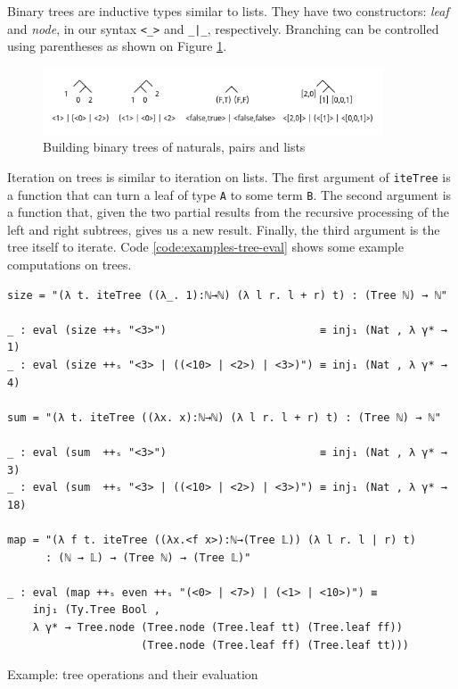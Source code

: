 Binary trees are inductive types similar to lists. They have two constructors: \textit{leaf} and \textit{node}, in our syntax \verb$<_>$ and \verb$_|_$, respectively. Branching can be controlled using parentheses as shown on Figure \ref{fig:tree-example}.

\begin{figure}[h!]
	\centering
	\includegraphics[width=0.9\textwidth]{../images/tree-example.png}
	\caption{Building binary trees of naturals, pairs and lists}
	\label{fig:tree-example}
\end{figure}

Iteration on trees is similar to iteration on lists. The first argument of \verb$iteTree$ is a function that can turn a leaf of type \verb$A$ to some term \verb$B$. The second argument is a function that, given the two partial results from the recursive processing of the left and right subtrees, gives us a new result. Finally, the third argument is the tree itself to iterate. Code \ref{code:examples-tree-eval} shows some example computations on trees.

\begin{listing}[H]
\begin{verbatim}
size = "(λ t. iteTree ((λ_. 1):ℕ→ℕ) (λ l r. l + r) t) : (Tree ℕ) → ℕ"

_ : eval (size ++ₛ "<3>")                        ≡ inj₁ (Nat , λ γ* → 1)
_ : eval (size ++ₛ "<3> | ((<10> | <2>) | <3>)") ≡ inj₁ (Nat , λ γ* → 4)

sum = "(λ t. iteTree ((λx. x):ℕ→ℕ) (λ l r. l + r) t) : (Tree ℕ) → ℕ"

_ : eval (sum  ++ₛ "<3>")                        ≡ inj₁ (Nat , λ γ* → 3)
_ : eval (sum  ++ₛ "<3> | ((<10> | <2>) | <3>)") ≡ inj₁ (Nat , λ γ* → 18)

map = "(λ f t. iteTree ((λx.<f x>):ℕ→(Tree 𝕃)) (λ l r. l | r) t)
      : (ℕ → 𝕃) → (Tree ℕ) → (Tree 𝕃)"

_ : eval (map ++ₛ even ++ₛ "(<0> | <7>) | (<1> | <10>)") ≡
    inj₁ (Ty.Tree Bool ,
    λ γ* → Tree.node (Tree.node (Tree.leaf tt) (Tree.leaf ff))
                     (Tree.node (Tree.leaf ff) (Tree.leaf tt)))
\end{verbatim}
\caption{Example: tree operations and their evaluation}
\label{code:examples-tree-eval}
\end{listing}

